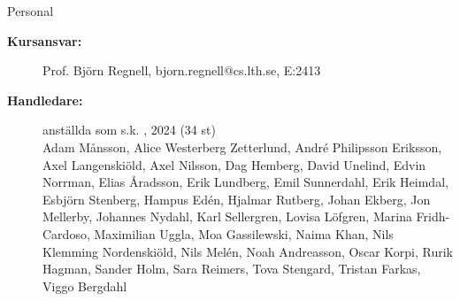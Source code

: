 \ifkompendium\else
\begin{SlideExtra}{Personal \CurrentYear}\SlideFontSmall
\begin{description}
\item [\bfseries Kursansvar:] Prof. Björn Regnell, bjorn.regnell@cs.lth.se, E:2413
\item [\bfseries Handledare:]  anställda som s.k. , %
2024 (34 st) \\
Adam Månsson,
Alice Westerberg Zetterlund,
André Philipsson Eriksson,
Axel Langenskiöld,
Axel Nilsson,
Dag Hemberg,
David Unelind,
Edvin Norrman,
Elias Åradsson,
Erik Lundberg,
Emil Sunnerdahl,
Erik Heimdal,
Esbjörn Stenberg,
Hampus Edén,
Hjalmar Rutberg,
Johan Ekberg,
Jon Mellerby,
Johannes Nydahl,
Karl Sellergren,
Lovisa Löfgren,
Marina Fridh-Cardoso,
Maximilian Uggla,
Moa Gassilewski,
Naima Khan,
Nils Klemming Nordenskiöld,
Nils Melén,
Noah Andreasson,
Oscar Korpi,
Rurik Hagman,
Sander Holm,
Sara Reimers,
Tova Stengard,
Tristan Farkas,
Viggo Bergdahl


\end{description}
\end{SlideExtra}
